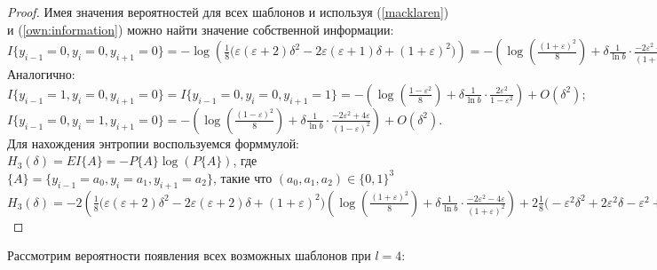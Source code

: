 \documentclass[a4paper,12pt]{article}
\theoremstyle{plain}
\begin{document}
		\begin{proof}
			Имея значения вероятностей для всех шаблонов и используя (\ref{macklaren}) и (\ref{own:information}) можно найти значение собственной информации:\\
			$I\{y_{i-1} = 0, y_i = 0, y_{i+1} = 0\} =-\log(\frac{1}{8}\bigr(\varepsilon(\varepsilon+2)\delta^2 - 2\varepsilon(\varepsilon+1)\delta + (1+\varepsilon)^2 \bigr))=-( \log(\frac{(1+\varepsilon)^2}{8})+\delta\frac{1}{\ln b}\cdot\frac{-2\varepsilon^2-4\varepsilon}{(1+\varepsilon)^2}) + O(\delta^2).$\\
		Аналогично:			\\
		$I\{y_{i-1} = 1, y_i = 0, y_{i+1} = 0\}= I\{y_{i-1} = 0, y_i = 0, y_{i+1} = 1\}= -(\log(\frac{1-\varepsilon^2}{8})+\delta\frac{1}{\ln b}\cdot\frac{2\varepsilon^2}{1-\varepsilon^2}) + O(\delta^2);$\\
		$I\{y_{i-1} = 0, y_i = 1, y_{i+1} = 0\}= -(\log(\frac{(1-\varepsilon)^2}{8})+\delta\frac{1}{\ln b}\cdot\frac{-2\varepsilon^2+4\varepsilon}{(1-\varepsilon)^2}) + O(\delta^2).$\\
		Для нахождения энтропии воспользуемся форммулой:
			$H_3(\delta)=EI\{A\}=-P\{A\}\log(P\{A\})$,  где $\{A\}=\{y_{i-1} = a_0, y_i = a_1, y_{i+1} = a_2\}$, такие что $(a_0, a_1, a_2) \in \{0,1\}^3$\\
			$H_3(\delta)=-2(\frac{1}{8}\bigr(\varepsilon(\varepsilon+2)\delta^2 - 2\varepsilon(\varepsilon+2)\delta + (1+\varepsilon)^2 \bigr)( \log(\frac{(1+\varepsilon)^2}{8})+\delta\frac{1}{\ln b}\cdot\frac{-2\varepsilon^2-4\varepsilon}{(1+\varepsilon)^2}) + 2\frac{1}{8}\bigr(-\varepsilon^2\delta^2 + 2\varepsilon^2\delta  -\varepsilon^2 + 1\bigr)(\log(\frac{1-\varepsilon^2}{8})+\delta\frac{1}{\ln b}\cdot\frac{2\varepsilon^2}{1-\varepsilon^2}) + \frac{1}{8}\bigr(\varepsilon(\varepsilon-2)\delta^2 - 2\varepsilon(2+\varepsilon)\delta + (1-\varepsilon)^2 \bigr)(\log(\frac{(1-\varepsilon)^2}{8})+\delta\frac{1}{\ln b}\cdot\frac{-2\varepsilon^2+4\varepsilon}{(1-\varepsilon)^2})) + O(\delta^2) =-((1-\varepsilon)\log(1-\varepsilon) + (1+\varepsilon)\log(1+\varepsilon)+\log(\frac{1}{8}) + 2\varepsilon\delta \log\frac{1-\varepsilon}{1+\varepsilon})+ O(\delta^2)=H_3(0)- 2\varepsilon\delta \log\frac{1-\varepsilon}{1+\varepsilon}+ O(\delta^2)$
		\end{proof}
		
		Рассмотрим  вероятности появления всех возможных шаблонов при $l=4$:
		
\end{document}
